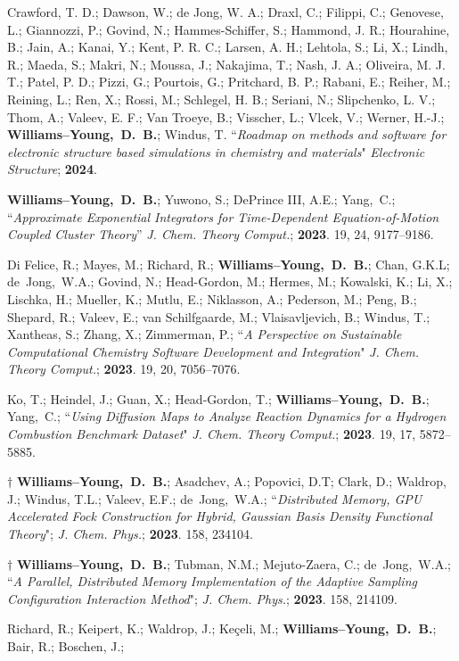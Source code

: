 \documentclass[10pt]{res} %
\newcommand*\me[0]{{\bf Williams--Young,~D.~B.}}
\newcommand*\cy[0]{Yang,~C.}
\newcommand*\bdj[0]{de~Jong,~W.A.}
\begin{document}
\begin{resume}
\begin{etaremune}
        Crawford, T. D.; Dawson, W.; de Jong, W. A.; Draxl, C.; Filippi, C.; Genovese, L.; Giannozzi, P.; 
        Govind, N.; Hammes-Schiffer, S.; Hammond, J. R.; Hourahine, B.; Jain, A.; Kanai, Y.; Kent, P. R. C.; 
        Larsen, A. H.; Lehtola, S.; Li, X.; Lindh, R.; Maeda, S.; Makri, N.; Moussa, J.; Nakajima, T.; 
        Nash, J. A.; Oliveira, M. J. T.; Patel, P. D.; Pizzi, G.; Pourtois, G.; Pritchard, B. P.; Rabani, E.; 
        Reiher, M.; Reining, L.; Ren, X.; Rossi, M.; Schlegel, H. B.; Seriani, N.; Slipchenko, L. V.; Thom, A.; 
        Valeev, E. F.; Van Troeye, B.; Visscher, L.; Vlcek, V.; Werner, H.-J.; \me; Windus, T.
        ``\emph{Roadmap on methods and software for electronic structure based simulations in chemistry and materials}"
        \emph{Electronic Structure}; \textbf{2024}. 
  \item \me; Yuwono, S.; DePrince III, A.E.; \cy; 
        ``\emph{Approximate Exponential Integrators for Time-Dependent Equation-of-Motion Coupled Cluster Theory}”
	\emph{J. Chem. Theory Comput.}; \textbf{2023}. 19, 24, 9177–9186.
  \item Di Felice, R.; Mayes, M.; Richard, R.; \me; Chan, G.K.L; \bdj; 
        Govind, N.; Head-Gordon, M.; Hermes, M.; Kowalski, K.; Li, X.; Lischka, H.; Mueller, K.; 
	Mutlu, E.; Niklasson, A.; Pederson, M.; Peng, B.; Shepard, R.; Valeev, E.; van Schilfgaarde, M.; 
	Vlaisavljevich, B.; Windus, T.; Xantheas, S.; Zhang, X.; Zimmerman, P.;
	``\emph{A Perspective on Sustainable Computational Chemistry Software Development and Integration}"
	\emph{J. Chem. Theory Comput.}; \textbf{2023}. 19, 20, 7056–7076.
  \item Ko, T.; Heindel, J.; Guan, X.;  Head-Gordon, T.; \me; \cy; 
        ``\emph{Using Diffusion Maps to Analyze Reaction Dynamics for a Hydrogen Combustion Benchmark Dataset}"
        \emph{J. Chem. Theory Comput.}; \textbf{2023}. 19, 17, 5872–5885.
  \item $\dagger$ \me; Asadchev, A.; Popovici, D.T; Clark, D.; Waldrop, J.; Windus, T.L.;
        Valeev, E.F.; \bdj;
        ``\emph{Distributed Memory, GPU Accelerated Fock Construction for Hybrid, Gaussian 
                Basis Density Functional Theory}";
        \emph{J. Chem. Phys.}; \textbf{2023}. 158, 234104.
  \item $\dagger$ \me; Tubman, N.M.; Mejuto-Zaera, C.; \bdj;
        ``\emph{A Parallel, Distributed Memory Implementation of the Adaptive 
                Sampling Configuration Interaction Method}";
        \emph{J. Chem. Phys.}; \textbf{2023}. 158, 214109. 
  \item Richard, R.; Keipert, K.; Waldrop, J.; Keçeli, M.; \me; Bair, R.; Boschen, J.; 

\end{etaremune}
\end{resume}
\end{document}
